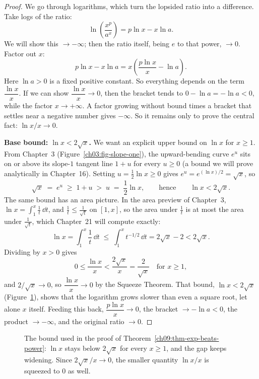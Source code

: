 \begin{proof}
We go through logarithms, which turn the lopsided ratio into a
difference. Take logs of the ratio:
\[
  \ln\!\left(\frac{x^{p}}{a^{x}}\right)
  = p\ln x - x\ln a .
\]
We will show this $\to -\infty$; then the ratio itself, being $e$ to that power,
$\to 0$. Factor out $x$:
\[
  p\ln x - x\ln a = x\left( \frac{p\ln x}{x} - \ln a\right).
\]
Here $\ln a > 0$ is a fixed positive constant. So everything depends on the term
$\dfrac{\ln x}{x}$. If we can show $\dfrac{\ln x}{x}\to 0$, then the bracket
tends to $0-\ln a = -\ln a < 0$, while the factor $x\to+\infty$. A factor
growing without bound times a bracket that settles near a negative number
gives $-\infty$. So it remains only to
prove the central fact: $\ln x / x \to 0$.

\textbf{Base bound: $\ln x < 2\sqrt x$.} We want an explicit upper bound on $\ln x$ for $x \ge 1$.
From Chapter~3 (Figure~\ref{ch03:fig-slope-one}), the upward-bending curve $e^u$ sits on or above its slope-$1$ tangent line $1 + u$ for every $u \ge 0$ (a bound we will prove analytically in Chapter~16). Setting $u = \tfrac12\ln x \ge 0$ gives $e^u = e^{(\ln x)/2} = \sqrt{x}$, so
\[
  \sqrt{x} \;=\; e^{u} \;\ge\; 1 + u \;>\; u \;=\; \frac{1}{2}\ln x,
  \qquad\text{hence}\qquad
  \ln x < 2\sqrt{x}.
\]
The same bound has an area picture. In the area preview of Chapter~3,
$\ln x = \int_1^x \frac{1}{t}\,\dd t$, and $\frac{1}{t} \le \frac{1}{\sqrt{t}}$
on $[1,x]$, so the area under $\frac1t$ is at most the area under
$\frac{1}{\sqrt t}$, which Chapter~21 will compute exactly:
\[
  \ln x = \int_1^x \frac{1}{t}\,\dd t \;\le\; \int_1^x t^{-1/2}\,\dd t
  = 2\sqrt{x} - 2 < 2\sqrt{x}.
\]
Dividing by $x > 0$ gives
\[
  0 \le \frac{\ln x}{x} < \frac{2\sqrt x}{x} = \frac{2}{\sqrt x}
  \quad\text{for } x\ge 1,
\]
and $2/\sqrt x\to 0$, so $\dfrac{\ln x}{x}\to 0$ by the Squeeze Theorem.
That bound, $\ln x < 2\sqrt x$ (Figure~\ref{ch09:fig-log-sqrt}), shows that
the logarithm grows slower than even a
square root, let alone $x$ itself. Feeding this back,
$\dfrac{p\ln x}{x}\to 0$, the bracket $\to -\ln a<0$, the product $\to -\infty$,
and the original ratio $\to 0$.
\end{proof}

\begin{figure}[htbp]
\centering
{}
\caption{The bound used in the proof of
Theorem~\ref{ch09:thm-exp-beats-power}: $\ln x$ stays below $2\sqrt{x}$ for
every $x\ge1$, and the gap keeps widening. Since $2\sqrt x/x\to0$, the
smaller quantity $\ln x/x$ is squeezed to $0$ as well.}
\label{ch09:fig-log-sqrt}
\end{figure}


